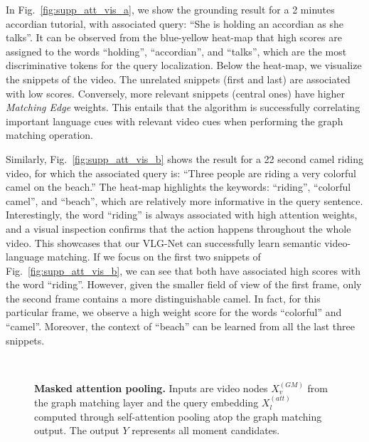 \documentclass[10pt,twocolumn,letterpaper]{article}
\begin{document}
In Fig.~\ref{fig:supp_att_vis_a}, we show the grounding result for a 2 minutes accordian tutorial, with associated query: ``She is holding an accordian as she talks''. It can be observed from the blue-yellow heat-map that high scores are assigned to the words ``holding'', ``accordian'', and ``talks'', which are the most discriminative tokens for the query localization.
Below the heat-map, we visualize the snippets of the video. The unrelated snippets (first and last) are associated with low scores. Conversely, more relevant snippets (central ones) have higher \textit{Matching Edge} weights. This entails that the algorithm is successfully correlating important language cues with relevant video cues when performing the graph matching operation.  

Similarly, Fig.~\ref{fig:supp_att_vis_b} shows the result for a 22 second camel riding video, for which the associated query is: ``Three people are riding a very colorful camel on the beach.'' The heat-map highlights the keywords: ``riding'', ``colorful camel'', and ``beach'', which are relatively more informative in the query sentence. Interestingly, the word ``riding'' is always associated with high attention weights, and a visual inspection confirms that the action happens throughout the whole video. This showcases that our VLG-Net can successfully learn semantic video-language matching.
If we focus on the first two snippets of Fig.~\ref{fig:supp_att_vis_b}, we can see that both have associated high scores with the word ``riding''. However, given the smaller field of view of the first frame, only the second frame contains a more distinguishable camel. In fact, for this particular frame, we observe a high weight score for the words ``colorful'' and ``camel''. Moreover, the context of ``beach'' can be learned from all the last three snippets.





\begin{figure}[!ht]
\captionsetup[subfigure]{labelformat=empty}
\begin{center}

    \\
    


    \vspace{.1cm}
     \caption{\textbf{Masked attention pooling.} Inputs are video nodes $X_v^{(GM)}$ from the graph matching layer and the query embedding $X_l^{(att)}$ computed through self-attention pooling atop the graph matching output. The output $Y$ represents all moment candidates.}
    \label{fig:att}
    
\end{center}
\end{figure}
\end{document}
